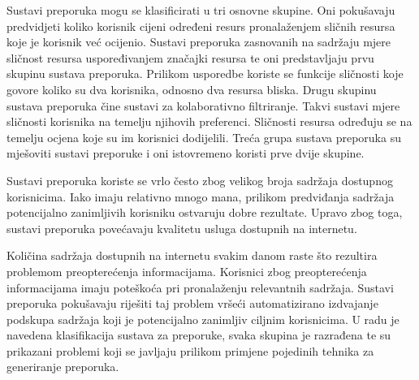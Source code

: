 \documentclass[times, utf8, seminar]{fer}
\begin{document}
Sustavi preporuka mogu se klasificirati u tri osnovne skupine. Oni pokušavaju predvidjeti koliko korisnik cijeni određeni resurs pronalaženjem sličnih resursa koje je korisnik već ocijenio. Sustavi preporuka zasnovanih na sadržaju mjere sličnost resursa uspoređivanjem značajki resursa te oni predstavljaju prvu skupinu sustava preporuka. Prilikom usporedbe koriste se funkcije sličnosti koje govore koliko su dva korisnika, odnosno dva resursa bliska. Drugu skupinu sustava preporuka čine sustavi za kolaborativno filtriranje. Takvi sustavi mjere sličnosti korisnika na temelju njihovih preferenci. Sličnosti resursa određuju se na temelju ocjena koje su im korisnici dodijelili. Treća grupa sustava preporuka su mješoviti sustavi preporuke i oni istovremeno koristi prve dvije skupine.

Sustavi preporuka koriste se vrlo često zbog velikog broja sadržaja dostupnog korisnicima. Iako imaju relativno mnogo mana, prilikom predviđanja sadržaja potencijalno zanimljivih korisniku ostvaruju dobre rezultate. Upravo zbog toga, sustavi preporuka povećavaju kvalitetu usluga dostupnih na internetu.

\nocite{*}



\begin{sazetak}
Količina sadržaja dostupnih na internetu svakim danom raste što rezultira problemom preopterećenja informacijama. Korisnici zbog preopterećenja informacijama imaju poteškoća pri pronalaženju relevantnih sadržaja. Sustavi preporuka pokušavaju riješiti taj problem vršeći automatizirano izdvajanje podskupa sadržaja koji je potencijalno zanimljiv ciljnim korisnicima. U radu je navedena klasifikacija sustava za preporuke, svaka skupina je razrađena te su prikazani problemi koji se javljaju prilikom primjene pojedinih tehnika za generiranje preporuka. 

\end{sazetak}
\end{document}
